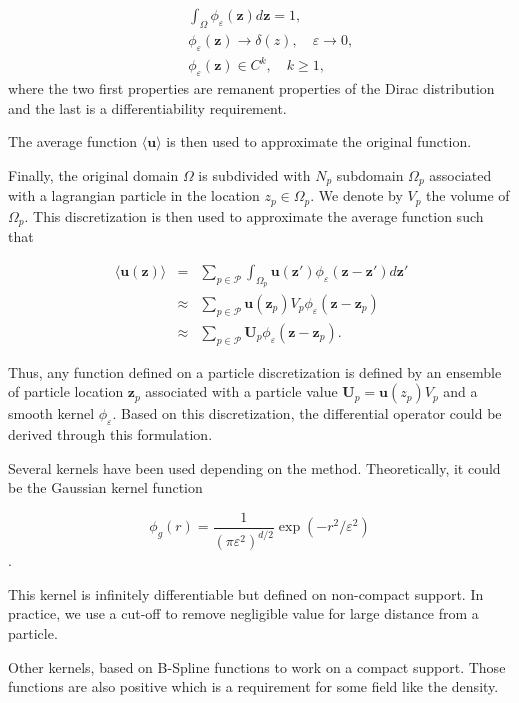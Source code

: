 \begin{eqnarray*}
	&& \int_{\Omega} \phi_\varepsilon(\bm z) d\bm z = 1,      \\
	&& \phi_\varepsilon(\bm z) \to \delta(z), \quad \varepsilon \to 0, \\
	&& \phi_\varepsilon(\bm z) \in C^k,  \quad k \geq 1,
\end{eqnarray*} where the two first properties are remanent properties of the Dirac distribution and the last is a differentiability requirement.

The average function $\langle \bm u \rangle$ is then used to approximate the original function.

Finally, the original domain $\Omega$ is subdivided with $N_p$ subdomain $\Omega_p$ associated with a lagrangian particle in the location $z_p \in \Omega_p$. We denote by $V_p$ the volume of $\Omega_p$. This discretization is then used to approximate the average function such that

\begin{eqnarray}~\label{part_approx}
	\langle \bm u(\bm z) \rangle &=& \sum_{p \in \mathcal P} \int_{\Omega_p} \bm u(\bm z') \phi_\varepsilon(\bm z-\bm z') d\bm z' \\
	&\approx& \sum_{p \in \mathcal P} \bm u(\bm z_p) V_p \phi_\varepsilon (\bm z-\bm z_p) \\
	&\approx& \sum_{p \in \mathcal P} \bm U_p \phi_\varepsilon (\bm z-\bm z_p).
\end{eqnarray}

Thus, any function defined on a particle discretization is defined by an ensemble of particle location $\bm z_p$ associated with a particle value $\bm U_p = \bm u(z_p) V_p$ and a smooth kernel $\phi_\varepsilon$.
Based on this discretization, the differential operator could be derived through this formulation.

Several kernels have been used depending on the method. Theoretically, it could be the Gaussian kernel function

\begin{equation*}
	\phi_g(r) = \frac{1}{{(\pi \varepsilon^2)}^{d/2}} \exp(-r^2/\varepsilon^2)
\end{equation*}.

This kernel is infinitely differentiable but defined on non-compact support. In practice, we use a cut-off to remove negligible value for large distance from a particle.

Other kernels, based on B-Spline functions to work on a compact support. Those functions are also positive which is a requirement for some field like the density.

